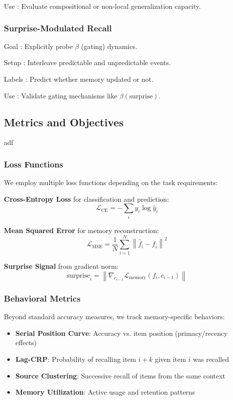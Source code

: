 Use : Evaluate compositional or non-local generalization capacity.

\subsubsection{Surprise-Modulated Recall}
Goal : Explicitly probe  $\beta$  (gating) dynamics.

Setup : Interleave predictable and unpredictable events.

Labels : Predict whether memory updated or not.

Use : Validate gating mechanisms like  $\beta(\text{surprise})$.


\subsection{Metrics and Objectives}
adf

\subsubsection{Loss Functions}
We employ multiple loss functions depending on the task requirements:

\textbf{Cross-Entropy Loss} for classification and prediction:
\begin{equation}
\mathcal{L}_{\text{CE}} = -\sum_{i} y_i \log \hat{y}_i
\end{equation}

\textbf{Mean Squared Error} for memory reconstruction:
\begin{equation}
\mathcal{L}_{\text{MSE}} = \frac{1}{N} \sum_{i=1}^N \left\|\hat{f}_i - f_i\right\|^2
\end{equation}

\textbf{Surprise Signal} from gradient norm:
\begin{equation}
\text{surprise}_i = \left\|\nabla_{c_{i-1}} \mathcal{L}_{\text{memory}}(f_i, c_{i-1})\right\|
\end{equation}


\subsubsection{Behavioral Metrics}
Beyond standard accuracy measures, we track memory-specific behaviors:
\begin{itemize}
\item \textbf{Serial Position Curve}: Accuracy vs. item position (primacy/recency effects)
\item \textbf{Lag-CRP}: Probability of recalling item $i+k$ given item $i$ was recalled
\item \textbf{Source Clustering}: Successive recall of items from the same context
\item \textbf{Memory Utilization}: Active usage and retention patterns
\end{itemize}



